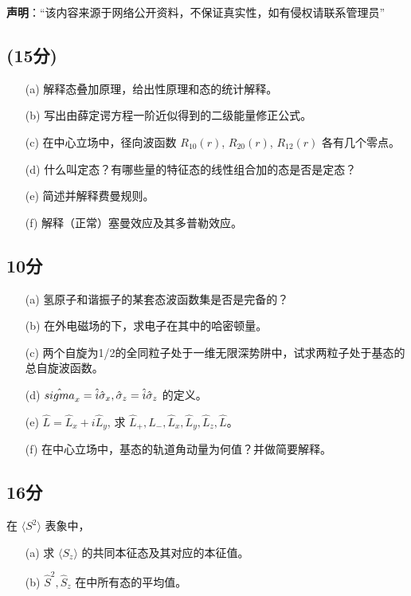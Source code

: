 
\textbf{声明}：“该内容来源于网络公开资料，不保证真实性，如有侵权请联系管理员”



\subsection{(15分)}
\begin{enumerate}
    \item [(a)] 解释态叠加原理，给出性原理和态的统计解释。
    \item [(b)] 写出由薛定谔方程一阶近似得到的二级能量修正公式。
    \item [(c)] 在中心立场中，径向波函数 $R_{10}(r)$, $R_{20}(r)$, $R_{12}(r)$ 各有几个零点。
    \item [(d)] 什么叫定态？有哪些量的特征态的线性组合加的态是否是定态？
    \item [(e)] 简述并解释费曼规则。
    \item [(f)] 解释（正常）塞曼效应及其多普勒效应。
\end{enumerate}

\subsection{10分}
\begin{enumerate}
    \item[(a)] 氢原子和谐振子的某套态波函数集是否是完备的？
    \item[(b)] 在外电磁场的下，求电子在其中的哈密顿量。
    \item[(c)] 两个自旋为1/2的全同粒子处于一维无限深势阱中，试求两粒子处于基态的总自旋波函数。
    \item[(d)] $\hat{\\sigma}_x = \hat{i} \hat{\sigma}_x, \hat{\sigma}_z = \hat{i} \hat{\sigma}_z$ 的定义。
    \item[(e)] $\hat{L} = \hat{L}_x + i\hat{L}_y$, 求 ${\hat{L}_+, \hat{L}_-, \hat{L}_x, \hat{L}_y, \hat{L}_z, \hat{L} }$。
    \item[(f)] 在中心立场中，基态的轨道角动量为何值？并做简要解释。
\end{enumerate}

\subsection{16分}
在 $\langle S^2 \rangle$ 表象中，
\begin{enumerate}
    \item[(a)] 求 $\langle S_z \rangle$ 的共同本征态及其对应的本征值。
    \item[(b)] $\hat{S}^2, \hat{S}_z$ 在中所有态的平均值。
\end{enumerate}

